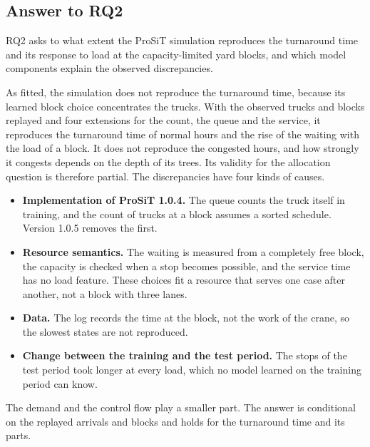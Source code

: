 \subsection{Answer to RQ2}
\label{sec:res_rq2}

RQ2 asks to what extent the ProSiT simulation reproduces the turnaround time and
its response to load at the capacity-limited yard blocks, and which model
components explain the observed discrepancies.

As fitted, the simulation does not reproduce the turnaround time, because its learned
block choice concentrates the trucks. With the observed trucks and blocks replayed and
four extensions for the count, the queue and the service, it reproduces the turnaround
time of normal hours and the rise of the waiting with the load of a block. It does
not reproduce the congested hours, and how strongly it congests depends on the depth
of its trees. Its validity for the allocation question is therefore partial. The
discrepancies have four kinds of causes.
\begin{itemize}
\item \textbf{Implementation of ProSiT 1.0.4.} The queue counts the truck itself in
training, and the count of trucks at a block assumes a sorted schedule. Version 1.0.5
removes the first.
\item \textbf{Resource semantics.} The waiting is measured from a completely free
block, the capacity is checked when a stop becomes possible, and the service time has
no load feature. These choices fit a resource that serves one case after another, not
a block with three lanes.
\item \textbf{Data.} The log records the time at the block, not the work of the
crane, so the slowest states are not reproduced.
\item \textbf{Change between the training and the test period.} The stops of the
test period took longer
at every load, which no model learned on the training period can know.
\end{itemize}
The demand and the control flow play a smaller part. The answer is conditional on
the replayed arrivals and blocks and holds for the turnaround time and its parts.

